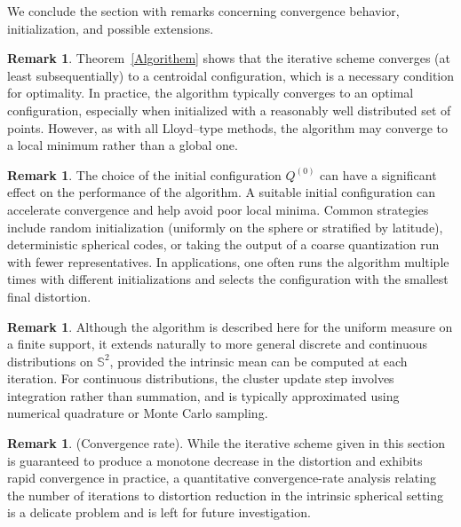 \documentclass[12pt, reqno]{amsart}
\theoremstyle{plain}
\theoremstyle{definition}
\newtheorem{remark}[subsection]{Remark}
\newcommand{\D}[1]{\mathbb{#1}}%
\begin{document}
We conclude the section with remarks concerning convergence behavior, initialization, and possible extensions.


 
\begin{remark}
Theorem~\ref{Algorithem} shows that the iterative scheme converges (at least subsequentially) to a centroidal configuration,
which is a necessary condition for optimality. In practice, the algorithm typically converges to an optimal
configuration, especially when initialized with a reasonably well distributed set of points. However, as with all
Lloyd--type methods, the algorithm may converge to a local minimum rather than a global one.
\end{remark}


\begin{remark}
The choice of the initial configuration $ {Q}^{(0)}$ can have a significant effect on the performance of the
algorithm. A suitable initial configuration can accelerate convergence and help avoid poor local minima. Common
strategies include random initialization (uniformly on the sphere or stratified by latitude), deterministic spherical
codes, or taking the output of a coarse quantization run with fewer representatives. In applications, one often runs
the algorithm multiple times with different initializations and selects the configuration with the smallest final
distortion.
\end{remark}


\begin{remark}
Although the algorithm is described here for the uniform measure on a finite support, it extends naturally to more
general discrete and continuous distributions on $\D S^2$, provided the intrinsic mean can be computed at each
iteration. For continuous distributions, the cluster update step involves integration rather than summation, and is
typically approximated using numerical quadrature or Monte Carlo sampling.
\end{remark} 

\begin{remark} (Convergence rate).
While the iterative scheme given in this section is guaranteed to produce a monotone decrease in the
distortion and exhibits rapid convergence in practice, a quantitative convergence-rate analysis
relating the number of iterations to distortion reduction in the intrinsic spherical setting
is a delicate problem and is left for future investigation.
\end{remark}
\end{document}
